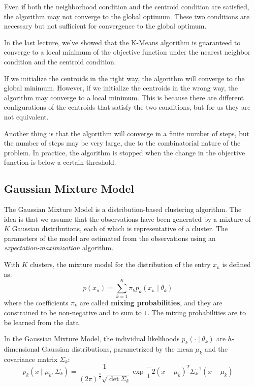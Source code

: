 Even if both the neighborhood condition and the centroid condition are satisfied, the algorithm may not converge to the global optimum. These two conditions are necessary but not sufficient for convergence to the global optimum.



In the last lecture, we've showed that the K-Means algorithm is guaranteed to converge to a local minimum of the objective function under the nearest neighbor condition and the centroid condition.

If we initialize the centroids in the right way, the algorithm will converge to the global minimum. However, if we initialize the centroids in the wrong way, the algorithm may converge to a local minimum. This is because there are different configurations of the centroids that satisfy the two conditions, but for us they are not equivalent.


Another thing is that the algorithm will converge in a finite number of steps, but the number of steps may be very large, due to the combinatorial nature of the problem. In practice, the algorithm is stopped when the change in the objective function is below a certain threshold.

\subsection*{Gaussian Mixture Model}
The Gaussian Mixture Model is a distribution-based clustering algorithm. The idea is that we assume that the observations have been generated by a mixture of $K$ Gaussian distributions, each of which is representative of a cluster. The parameters of the model are estimated from the observations using an \textit{expectation-maximization} algorithm.

With $K$ clusters, the mixture model for the distribution of the entry $x_n$ is defined as:
\[
    p(x_n) = \sum_{k=1}^{K} \pi_k p_k (x_n \mid \theta_k)
\]
where the coefficients $\pi_k$ are called \textbf{mixing probabilities}, and they are constrained to be non-negative and to sum to $1$. The mixing probabilities are to be learned from the data.

In the Gaussian Mixture Model, the individual likelihoods $p_k(\cdot \mid \theta_k)$ are $h$-dimensional Gaussian distributions, parametrized by the mean $\mu_k$ and the covariance matrix $\Sigma_k$:
\[
    p_k(x \mid \mu_k, \Sigma_k) = \frac{1}{(2\pi)^{\frac{h}{2}} \sqrt{\det \Sigma_k}} \exp{\frac-{1}{2}(x-\mu_k)^T \Sigma_k^{-1} (x-\mu_k)}
\]

